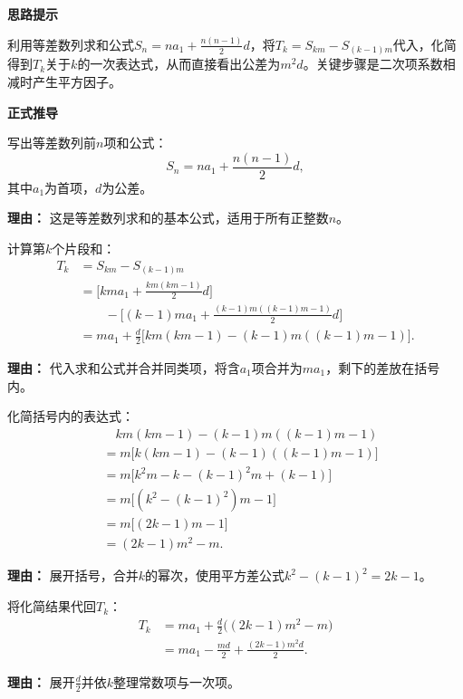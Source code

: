 \begin{proofbox}

	\textbf{\textcolor{CProof}{思路提示}}

	利用等差数列求和公式$S_n = n a_1 + \frac{n(n-1)}{2}d$，将$T_k = S_{km} - S_{(k-1)m}$代入，化简得到$T_k$关于$k$的一次表达式，从而直接看出公差为$m^2 d$。关键步骤是二次项系数相减时产生平方因子。

	\medskip
	\textbf{\textcolor{CProof}{正式推导}}
	\begin{description}[style=nextline, leftmargin=2.8em, labelsep=0.5em, itemsep=0.55em]
		\item[\textbf{步骤一（求和公式）：}] 写出等差数列前$n$项和公式：
			\[
				S_n = n a_1 + \frac{n(n-1)}{2}d,
			\]
			其中$a_1$为首项，$d$为公差。
			\par\textbf{理由：} 这是等差数列求和的基本公式，适用于所有正整数$n$。

		\item[\textbf{步骤二（$T_k$表达式）：}] 计算第$k$个片段和：
			\[
				\begin{aligned}
					T_k &= S_{km} - S_{(k-1)m} \\
					&= \Big[ km a_1 + \frac{km(km-1)}{2}d \Big] \\
					&\qquad - \Big[ (k-1)m a_1 + \frac{(k-1)m((k-1)m-1)}{2}d \Big]\\
					&= m a_1 + \frac{d}{2}\Big[ km(km-1) - (k-1)m((k-1)m-1) \Big].
			\end{aligned}
			\]
			\par\textbf{理由：} 代入求和公式并合并同类项，将含$a_1$项合并为$m a_1$，剩下的差放在括号内。

		\item[\textbf{步骤三（化简括号）：}] 化简括号内的表达式：
			\[
				\begin{aligned}
					&\quad km(km-1) - (k-1)m((k-1)m-1) \\
					&= m\Big[ k(km-1) - (k-1)((k-1)m-1) \Big] \\
					&= m\Big[ k^2 m - k - (k-1)^2 m + (k-1) \Big] \\
					&= m\Big[ (k^2 - (k-1)^2)m - 1 \Big] \\
					&= m\Big[ (2k-1)m - 1 \Big] \\
					&= (2k-1)m^2 - m.
			\end{aligned}
			\]
			\par\textbf{理由：} 展开括号，合并$k$的幂次，使用平方差公式$k^2 - (k-1)^2 = 2k-1$。

		\item[\textbf{步骤四（$T_k$最简形式）：}] 将化简结果代回$T_k$：
			\[
				\begin{aligned}
					T_k &= m a_1 + \frac{d}{2}\big( (2k-1)m^2 - m \big) \\
					&= m a_1 - \frac{m d}{2} + \frac{(2k-1)m^2 d}{2}.
			\end{aligned}
			\]
			\par\textbf{理由：} 展开$\frac{d}{2}$并依$k$整理常数项与一次项。


\end{description}
\end{proofbox}
